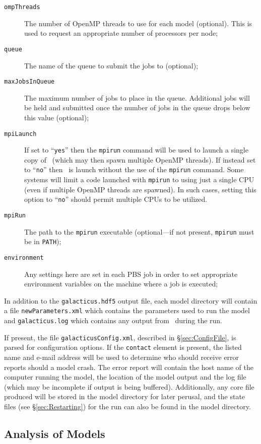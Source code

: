 \begin{description}
\begin{description}
\item[{\tt ompThreads}] The number of OpenMP threads to use for each model (optional). This is used to request an appropriate number of processors per node;
\item[{\tt queue}] The name of the queue to submit the jobs to (optional);
\item[{\tt maxJobsInQueue}] The maximum number of jobs to place in the queue. Additional jobs will be held and submitted once the number of jobs in the queue drops below this value (optional);
\item[{\tt mpiLaunch}] If set to ``{\tt yes}'' then the {\tt mpirun} command will be used to launch a single copy of \glc\ (which may then spawn multiple OpenMP threads). If instead set to ``{\tt no}'' then \glc\ is launch without the use of the {\tt mpirun} command. Some systems will limit a code launched with {\tt mpirun} to using just a single CPU (even if multiple OpenMP threads are spawned). In such cases, setting this option to ``{\tt no}'' should permit multiple CPUs to be utilized.
\item[{\tt mpiRun}] The path to the {\tt mpirun} executable (optional---if not present, {\tt mpirun} must be in {\tt PATH});
\item[{\tt environment}] Any settings here are set in each {\sc PBS} job in order to set appropriate environment variables on the machine where a job is executed;
\end{description}
\end{description}

In addition to the {\tt galacticus.hdf5} output file, each model directory will contain a file {\tt newParameters.xml} which contains the parameters used to run the model and {\tt galacticus.log} which contains any output from \glc\ during the run.

If present, the file {\tt galacticusConfig.xml}, described in \S\ref{sec:ConfigFile}, is parsed for configuration options. If the {\tt contact} element is present, the listed name and e-mail address will be used to determine who should receive error reports should a model crash. The error report will contain the host name of the computer running the model, the location of the model output and the log file (which may be incomplete if output is being buffered). Additionally, any core file produced will be stored in the model directory for later perusal, and the state files (see \S\ref{sec:Restarting}) for the run can also be found in the model directory.

\subsection{Analysis of Models}\label{sec:AnalysisScripts}

